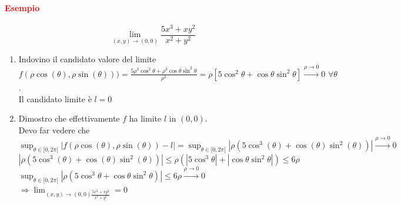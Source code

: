 \documentclass{article}
\begin{document}
\paragraph{\textcolor{red}{Esempio}}
\begin{equation*}
    \lim_{(x,y)\rightarrow(0,0)}\frac{5x^3+xy^2}{x^2+y^2}
\end{equation*}
\begin{enumerate}
    \item Indovino il candidato valore del limite\\
    $f(\rho\cos(\theta),\rho\sin(\theta)))=\frac{5\rho^3\cos^2\theta+\rho^3\cos\theta\sin^2\theta}{\rho^2}=\rho[5\cos^2\theta+\cos\theta\sin^2\theta]\xrightarrow{\rho\rightarrow0}0\,\, \forall \theta$.\\
    Il candidato limite è $l=0$
    \item Dimostro che effettivamente $f$ ha limite $l$ in $(0,0)$.\\
    Devo far vedere che \\
    $\sup_{\theta \in [0,2\pi[} |f(\rho\cos(\theta),\rho\sin(\theta))-l|=\sup_{\theta\in[0,2\pi[} |\rho(5\cos^3(\theta)+\cos(\theta)\sin^2(\theta))|\xrightarrow{\rho\rightarrow0}0$\\
    $|\rho(5\cos^3(\theta)+\cos(\theta)\sin^2(\theta))|\leq \rho(|5\cos^3\theta|+|\cos\theta\sin^2\theta|)\leq 6\rho$\\
    $\sup_{\theta\in[0,2\pi[}|\rho(5\cos^3\theta+\cos\theta\sin^2\theta)|\leq 6\rho \xrightarrow{\rho\rightarrow0}0$\\
    $\Rightarrow \lim_{(x,y)\rightarrow(0,0)\frac{5x^3+xy^2}{x^2+y^2}}=0$
\end{enumerate}
\end{document}
